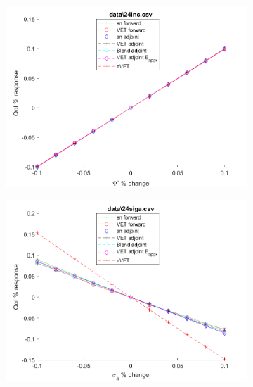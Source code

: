 \documentclass[12pt]{report}
\begin{document}
\begin{figure}[H]
\centering
\begin{subfigure}{.5\textwidth}
  \centering
  \includegraphics[width=.98\linewidth]{figures2/24incSens.png}
\end{subfigure}%
\begin{subfigure}{.5\textwidth}
  \centering
  \includegraphics[width=.98\linewidth]{figures2/24sigaSens.png}
\end{subfigure}
%
\begin{subfigure}{.5\textwidth}
  \centering

\end{subfigure}
\end{figure}
\end{document}
